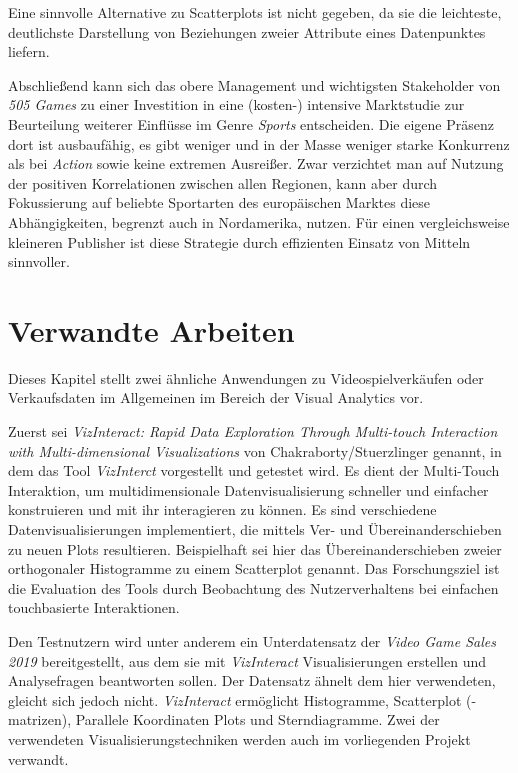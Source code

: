 \documentclass[usegeometry=true]{scrartcl}
\begin{document}
Eine sinnvolle Alternative zu Scatterplots ist nicht gegeben, 
da sie die leichteste, deutlichste Darstellung von Beziehungen zweier Attribute eines Datenpunktes liefern. 

Abschließend kann sich das obere Management und wichtigsten Stakeholder von \textit{505 Games}
zu einer Investition in eine (kosten-) intensive Marktstudie zur Beurteilung weiterer Einflüsse im Genre \textit{Sports} entscheiden. 
Die eigene Präsenz dort ist ausbaufähig, es gibt weniger und in der Masse weniger starke Konkurrenz als bei \textit{Action} sowie keine extremen Ausreißer.
Zwar verzichtet man auf Nutzung der positiven Korrelationen zwischen allen Regionen, kann aber durch Fokussierung auf beliebte Sportarten des europäischen Marktes diese Abhängigkeiten, begrenzt auch in Nordamerika, nutzen.
Für einen vergleichsweise kleineren Publisher ist diese Strategie durch effizienten Einsatz von Mitteln sinnvoller.
 
\section{Verwandte Arbeiten}
Dieses Kapitel stellt zwei ähnliche Anwendungen zu Videospielverkäufen oder Verkaufsdaten im Allgemeinen im Bereich der Visual Analytics vor. 

Zuerst sei \textit{VizInteract: Rapid Data Exploration Through Multi-touch Interaction with Multi-dimensional Visualizations} von Chakraborty/Stuerzlinger genannt, 
in dem das Tool \textit{VizInterct} vorgestellt und getestet wird.\cite{Chakraborty.2021}
Es dient der Multi-Touch Interaktion, um multidimensionale Datenvisualisierung schneller und einfacher konstruieren und mit ihr interagieren zu können.
Es sind verschiedene Datenvisualisierungen implementiert, die mittels Ver- und Übereinanderschieben zu neuen Plots resultieren.
Beispielhaft sei hier das Übereinanderschieben zweier orthogonaler Histogramme zu einem Scatterplot genannt. 
Das Forschungsziel ist die Evaluation des Tools durch Beobachtung des Nutzerverhaltens bei einfachen touchbasierte Interaktionen.

Den Testnutzern wird unter anderem ein Unterdatensatz der \textit{Video Game Sales 2019} bereitgestellt, 
aus dem sie mit \textit{VizInteract} Visualisierungen erstellen und Analysefragen beantworten sollen.
Der Datensatz ähnelt dem hier verwendeten, gleicht sich jedoch nicht. 
\textit{VizInteract} ermöglicht Histogramme, Scatterplot (-matrizen), Parallele Koordinaten Plots und Sterndiagramme. 
Zwei der verwendeten Visualisierungstechniken werden auch im vorliegenden Projekt verwandt. 
\end{document}
